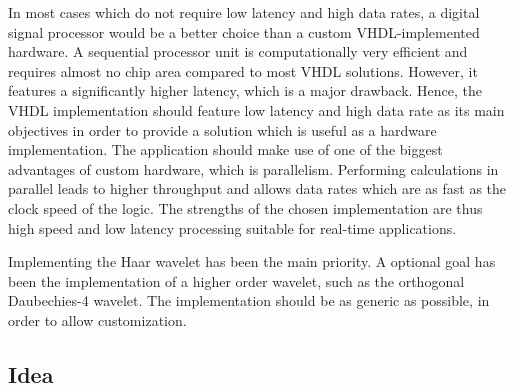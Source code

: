 \begin{refsection}
In most cases which do not require low latency and high data rates, a digital signal processor would be a better choice than a custom VHDL-implemented hardware.
A sequential processor unit is computationally very efficient and requires almost no chip area compared to most VHDL solutions.
However, it features a significantly higher latency, which is a major drawback.
Hence, the VHDL implementation should feature low latency and high data rate as its main objectives in order to provide a solution which is useful as a hardware implementation.
The application should make use of one of the biggest advantages of custom hardware, which is parallelism.
Performing calculations in parallel leads to higher throughput and allows data rates which are as fast as the clock speed of the logic.
The strengths of the chosen implementation are thus high speed and low latency processing suitable for real-time applications.

Implementing the Haar wavelet has been the main priority.
A optional goal has been the implementation of a higher order wavelet, such as the orthogonal Daubechies-4 wavelet.
The implementation should be as generic as possible, in order to allow customization.

\subsection{Idea}


\end{refsection}
